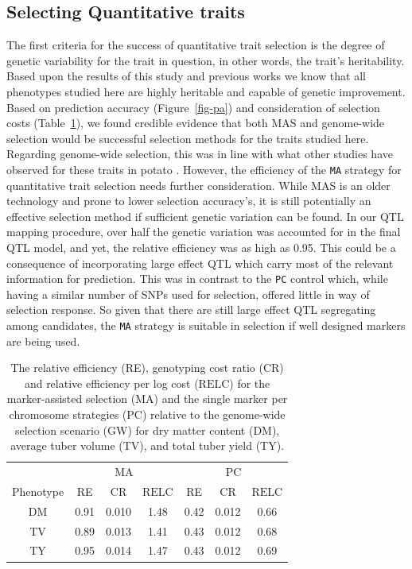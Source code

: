 \hypertarget{selecting-quantitative-traits}{%
\subsection{Selecting Quantitative
traits}\label{selecting-quantitative-traits}}

The first criteria for the success of quantitative trait selection is the
degree of genetic variability for the trait in question, in other words, 
the trait's heritability. Based upon the results of this study and previous
works \autocite{Adams2022} we know that all phenotypes studied here are highly
heritable and capable of genetic improvement. Based on prediction 
accuracy (Figure~\ref{fig-pa}) and consideration of
selection costs (Table~\ref{tbl-re}), we found credible evidence that
both MAS and genome-wide selection would be successful selection methods
for the traits studied here. Regarding genome-wide selection, this was in line with what other studies have observed for
these traits in potato \autocite{Adams2023,Wilson2021}. However, the
efficiency of the \texttt{MA} strategy for quantitative trait selection
needs further consideration. While MAS is an older technology and prone to lower selection accuracy's, it is still potentially an effective selection method
if sufficient genetic variation can be found. In our QTL mapping
procedure, over half the genetic variation was accounted for in the
final QTL model, and yet, the relative efficiency was as high as 0.95.
This could be a consequence of incorporating large effect QTL which
carry most of the relevant information for prediction. This was in
contrast to the \texttt{PC} control which, while having a similar number
of SNPs used for selection, offered little in way of selection
response. So given that there are still large effect QTL segregating
among candidates, the \texttt{MA} strategy is suitable in selection if
well designed markers are being used.

\hypertarget{tbl-re}{}
\begin{table}
\caption{\label{tbl-re}The relative efficiency (RE), genotyping cost ratio (CR) and relative efficiency per log cost
(\(\mathrm{RELC}\)) for the marker-assisted selection (MA) and the
single marker per chromosome strategies (PC) relative to the genome-wide
selection scenario (GW) for dry matter content (DM), average tuber
volume (TV), and total tuber yield (TY). }\tabularnewline

\centering
\begin{tabular}{ccccccc}
\toprule
\multicolumn{1}{c}{ } & \multicolumn{3}{c}{MA} & \multicolumn{3}{c}{PC} \\
\cmidrule(l{3pt}r{3pt}){2-4} \cmidrule(l{3pt}r{3pt}){5-7}
Phenotype & RE & CR & $\mathrm{RELC}$ & RE & CR & $\mathrm{RELC}$\\
\midrule
DM & 0.91 & 0.010 & 1.48 & 0.42 & 0.012 & 0.66\\
TV & 0.89 & 0.013 & 1.41 & 0.43 & 0.012 & 0.68\\
TY & 0.95 & 0.014 & 1.47 & 0.43 & 0.012 & 0.69\\
\bottomrule
\end{tabular}
\end{table}

